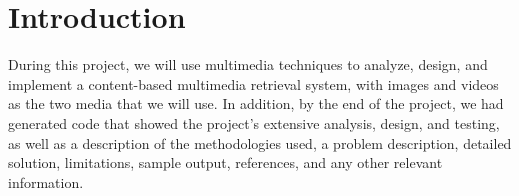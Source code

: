 \documentclass[pdftex,10pt,a4paper,oneside]{article}
\begin{document}
	\pagebreak
	
	\tableofcontents
	\pagebreak
	\listoffigures
	\pagebreak
	\listoftables
	\pagebreak
	\begin{abstract}{
			This paper presents imp multimedia project
	}	\end{abstract}
	\pagebreak
	\section*{Introduction}
	During this project, we will use multimedia techniques to analyze, design, and implement a content-based multimedia retrieval system, with images and videos as the two media that we will use. In addition, by the end of the project, we had generated code that showed the project's extensive analysis, design, and testing, as well as a description of the methodologies used, a problem description, detailed solution, limitations, sample output, references, and any other relevant information.
	 
	
	
	\pagebreak
	
\end{document}
